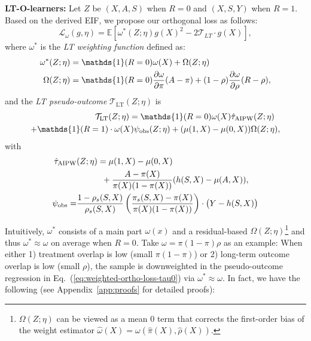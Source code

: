 \documentclass{article}
\theoremstyle{plain}
\theoremstyle{definition}
\theoremstyle{remark}
\newcommand{\1}{\mathds{1}}                %
\begin{document}
\begin{contributionbox}
\textbf{LT-O-learners:} Let $Z$ be $(X,A,S)$ when $R=0$ and $(X, S, Y)$ when $R=1$. Based on the derived EIF, we propose our orthogonal loss as follows:
\begin{equation}
\label{eq:weighted-ortho-loss-tau0}
\mathcal{L}_\omega(g, \eta) = \mathbb{E} \left[ \omega^*(Z;\eta) g(X)^2 -2\mathcal{T}_{LT}\cdot g(X)\right],
\end{equation}
where $\omega^*$ is the \textit{LT weighting function} defined as:
\footnotesize
\begin{align}
    \omega^*(Z;\eta) &= \1(R=0) \omega(X) + \Omega(Z;\eta) \label{omega-star-def} \\
    \Omega(Z;\eta)&=\1(R=0)\frac{\partial \omega}{\partial \pi} (A - \pi)
    + (1-\rho) \frac{\partial \omega}{\partial \rho} (R - \rho), \notag
\end{align}
\normalsize
and the \textit{LT pseudo-outcome} $\mathcal{T}_\mathrm{LT}(Z;\eta)$ is
\footnotesize
\begin{align}
\label{Tau-LT-def}
    \mathcal{T}_\mathrm{LT}&(Z;\eta) =  \1(R=0) \omega(X) \hat{\tau}_\mathrm{AIPW}(Z;\eta)\\
     +  \1(R=1)& \cdot\omega(X) \psi_\mathrm{obs}(Z;\eta) + (\mu(1,X)-\mu(0,X)) \Omega(Z;\eta),\notag
\end{align}
with
\begin{align*}
    \hat{\tau}_\mathrm{AIPW}&(Z;\eta) = \mu(1,X) - \mu(0,X) %
    \\ 
    &\quad\qquad +\frac{A-\pi(X)}{\pi(X)(1-\pi(X))}(h(S,X) - \mu(A,X)) , \notag \\
    \psi_\mathrm{obs} =& \frac{1-\rho_s(S,X)}{\rho_s(S,X)} \left( \frac{\pi_s(S,X) - \pi(X)}{\pi(X)(1-\pi(X))} \right)
    \cdot\big( Y - h(S,X) \big) \label{psi-obs-def}
\end{align*}

\end{contributionbox}
\normalsize
Intuitively, $\omega^*$ consists of a main part $\omega(x)$ and a residual-based $\Omega(Z;\eta)$\footnote{$\Omega(Z;\eta)$ can be viewed as a mean $0$ term that corrects the first-order bias of the weight estimator $\hat\omega(X)=\omega(\hat\pi(X),\hat\rho(X))$.} and thus $\omega^*\approx \omega$ on average when $R=0$. Take $\omega=\pi(1-\pi)\rho$ as an example: When either 1) treatment overlap is low (small $\pi(1-\pi)$) or 2) long-term outcome overlap is low (small $\rho$), the sample is downweighted in the pseudo-outcome regression in Eq.~(\ref{eq:weighted-ortho-loss-tau0}) via $\omega^*\approx \omega$. In fact, we have the following (see Appendix~\ref{app:proofs} for detailed proofs):
\end{document}
